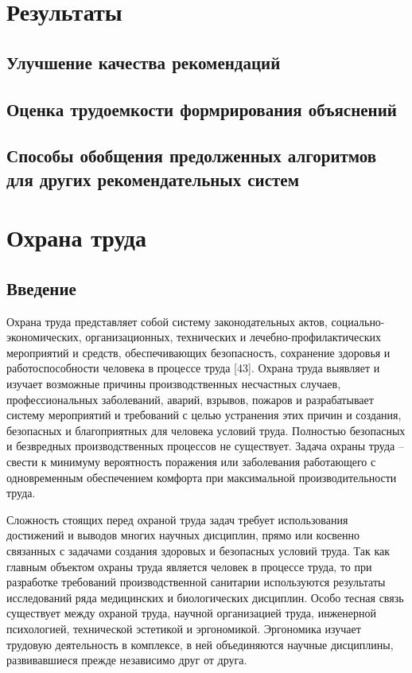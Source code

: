 \documentclass[12pt,a4paper]{report}
\begin{document}
\chapter{Результаты}
\section{Улучшение качества рекомендаций}
\section{Оценка трудоемкости формрирования объяснений}
\section{Способы обобщения предолженных алгоритмов для других рекомендательных систем}

\chapter{Охрана труда}
\section{Введение}
Охрана труда представляет собой систему законодательных актов, социально-экономических, организационных, технических и лечебно-профилактических мероприятий и средств, обеспечивающих безопасность, сохранение здоровья и работоспособности человека в процессе труда [43]. Охрана труда выявляет и изучает возможные причины производственных несчастных случаев, профессиональных заболеваний, аварий, взрывов, пожаров и разрабатывает систему мероприятий и требований с целью устранения этих причин и создания, безопасных и благоприятных для человека условий труда. Полностью безопасных и безвредных производственных процессов не существует. Задача охраны труда – свести к  минимуму вероятность поражения или заболевания работающего с одновременным обеспечением комфорта при максимальной производительности труда.

Сложность стоящих перед охраной труда задач требует использования достижений и выводов многих научных дисциплин, прямо или косвенно связанных с задачами создания здоровых и безопасных условий труда. Так как главным объектом охраны труда является человек в процессе труда, то при разработке требований производственной санитарии используются результаты исследований ряда медицинских и биологических дисциплин. Особо тесная связь существует между охраной труда, научной организацией труда, инженерной психологией, технической эстетикой и эргономикой. Эргономика изучает трудовую деятельность в комплексе, в ней объединяются научные дисциплины, развивавшиеся прежде независимо друг от друга. 
\end{document}
